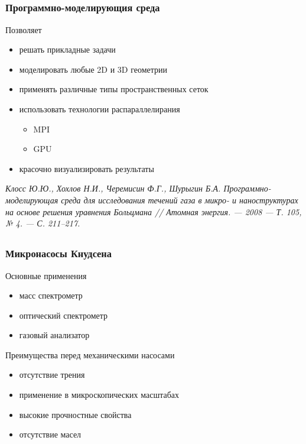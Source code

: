 \documentclass[ucs]{beamer}
\begin{document}
\subsection{}
\begin{frame}
	\frametitle{Программно-моделирующия среда}
	Позволяет
	\begin{itemize}
		\item решать прикладные задачи
		\item моделировать любые 2D и 3D геометрии
		\item применять различные типы пространственных сеток
		\item использовать технологии распараллелирания
		\begin{itemize}
			\item MPI
			\item GPU
		\end{itemize}
		\item красочно визуализировать результаты\newline
	\end{itemize}
	\textit{Клосс Ю.Ю., Хохлов Н.И., Черемисин Ф.Г., Шурыгин Б.А. Программно-моделирующая среда для исследования течений газа в микро- и наноструктурах на основе решения уравнения Больцмана // Атомная энергия. — 2008 — Т. 105, № 4. — С. 211–217.}
	
\end{frame}

\subsection{}
\begin{frame}
	\frametitle{Микронасосы Кнудсена}
	Основные применения
	\begin{itemize}
		\item масс спектрометр
		\item оптический спектрометр
		\item газовый анализатор\newline
	\end{itemize}
	Преимущества перед механическими насосами
	\begin{itemize}
		\item отсутствие трения
		\item применение в микроскопических масштабах
		\item высокие прочностные свойства
		\item отсутствие масел
	\end{itemize}
\end{frame}
\end{document}
